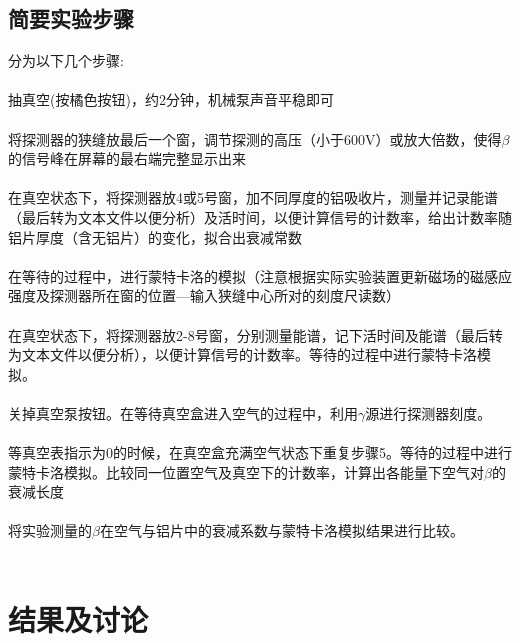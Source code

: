 \documentclass[a4paper]{article}
\begin{document}
\subsection{简要实验步骤}\label{sub:ExperimentalSteps}
分为以下几个步骤:\\\\
抽真空(按橘色按钮)，约2分钟，机械泵声音平稳即可\\\\
将探测器的狭缝放最后一个窗，调节探测的高压（小于600V）或放大倍数，使得$\beta$的信号峰在屏幕的最右端完整显示出来\\\\
在真空状态下，将探测器放4或5号窗，加不同厚度的铝吸收片，测量并记录能谱（最后转为文本文件以便分析）及活时间，以便计算信号的计数率，给出计数率随铝片厚度（含无铝片）的变化，拟合出衰减常数\\\\
在等待的过程中，进行蒙特卡洛的模拟（注意根据实际实验装置更新磁场的磁感应强度及探测器所在窗的位置—输入狭缝中心所对的刻度尺读数）\\\\
在真空状态下，将探测器放2-8号窗，分别测量能谱，记下活时间及能谱（最后转为文本文件以便分析），以便计算信号的计数率。等待的过程中进行蒙特卡洛模拟。\\\\
关掉真空泵按钮。在等待真空盒进入空气的过程中，利用$\gamma$源进行探测器刻度。\\\\
等真空表指示为0的时候，在真空盒充满空气状态下重复步骤5。等待的过程中进行蒙特卡洛模拟。比较同一位置空气及真空下的计数率，计算出各能量下空气对$\beta$的衰减长度\\\\
将实验测量的$\beta$在空气与铝片中的衰减系数与蒙特卡洛模拟结果进行比较。\\\\



\newpage
\section{结果及讨论}

\end{document}
